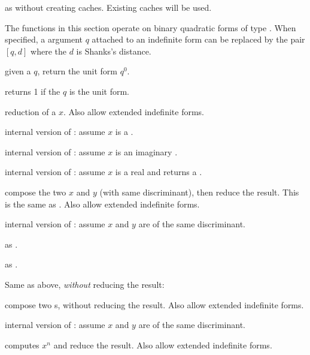  as  without
creating caches. Existing caches will be used.


The functions in this section operate on binary quadratic forms of type
. When specified, a  argument $q$ attached to an
indefinite form can be replaced by the pair $[q, d]$ where the 
$d$ is Shanks's distance.

 given a  $q$, return the unit form $q^0$.

 returns 1 if the 
$q$ is the unit form.


 reduction of a  $x$. Also allow extended
indefinite forms.

 internal version of : assume $x$
is a .

 internal version of : assume $x$
is an imaginary .

 internal version of : assume $x$
is a real  and returns a .


 compose the two  $x$ and $y$ (with
same discriminant), then reduce the result. This is the same as
. Also allow extended indefinite forms.

 internal version of : assume
$x$ and $y$ are  of the same discriminant.

 as .

 as .

\noindent Same as above, \emph{without} reducing the result:

 compose two s,
without reducing the result. Also allow extended indefinite forms.

 internal version of :
assume $x$ and $y$ are  of the same discriminant.


 computes $x^n$ and reduce the result. Also
allow extended indefinite forms.

